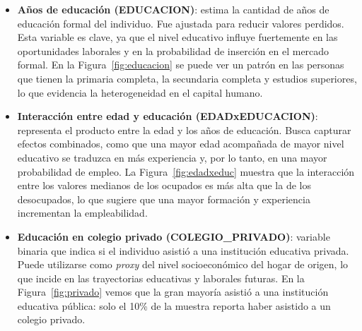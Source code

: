 \documentclass[11pt,a4paper]{article}
\begin{document}
\begin{itemize}
  \item \textbf{Años de educación (EDUCACION)}: estima la cantidad de años de educación
        formal del individuo. Fue ajustada para reducir valores perdidos. Esta variable es
        clave, ya que el nivel educativo influye fuertemente en las oportunidades laborales y
        en la probabilidad de inserción en el mercado formal. En la
        Figura~\ref{fig:educacion} se puede ver un patrón en las personas que tienen la
        primaria completa, la secundaria completa y estudios superiores, lo que evidencia la
        heterogeneidad en el capital humano.

  \item \textbf{Interacción entre edad y educación (EDADxEDUCACION)}: representa el producto
        entre la edad y los años de educación. Busca capturar efectos combinados, como que
        una mayor edad acompañada de mayor nivel educativo se traduzca en más experiencia y,
        por lo tanto, en una mayor probabilidad de empleo. La Figura~\ref{fig:edadxeduc}
        muestra que la interacción entre los valores medianos de los ocupados es más alta que
        la de los desocupados, lo que sugiere que una mayor formación y experiencia
        incrementan la empleabilidad.

  \item \textbf{Educación en colegio privado (COLEGIO\_PRIVADO)}: variable binaria que indica
        si el individuo asistió a una institución educativa privada. Puede utilizarse como
        \textit{proxy} del nivel socioeconómico del hogar de origen, lo que incide en las
        trayectorias educativas y laborales futuras. En la Figura~\ref{fig:privado} vemos que
        la gran mayoría asistió a una institución educativa pública: solo el 10\% de la
        muestra reporta haber asistido a un colegio privado.
\end{itemize}
\end{document}
